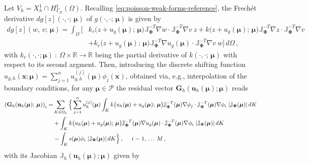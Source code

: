 \documentclass[12pt, a4paper, twoside, openright]{report}
\numberwithin{equation}{chapter}
\theoremstyle{theorem}
\theoremstyle{definition}
\theoremstyle{remark}
\theoremstyle{proposition}
\numberwithin{figure}{chapter}
\newcommand{\bg}[1]{\boldsymbol{#1}}
\begin{document}
		Let $V_h = X_h^1 \cap H^1_{\Gamma_D}(\Omega)$. Recalling \eqref{eq:poisson-weak-forms-reference}, the Frech\'et derivative $dg[z](\cdot, \cdot; \, \bg{\mu})$ of $g(\cdot, \cdot; \, \bg{\mu})$ is given by
		\begin{equation*}
			\begin{aligned}
			dg[z](w, \, v; \, \bg{\mu}) = \int_{\Omega} \big[ & k_r \big( z + u_g(\bg{\mu}); \, \bg{\mu} \big) \mathbb{J}^{-T}_{\bg{\Phi}} \nabla w \cdot \mathbb{J}^{-T}_{\bg{\Phi}} \nabla v ~ z + k \big( z + u_g(\bg{\mu}); \, \bg{\mu} \big) \mathbb{J}_{\bg{\Phi}}^{-T} \nabla z \cdot \mathbb{J}^{-T}_{\bg{\Phi}} \nabla v \\
			& + k_r \big(z + u_g(\bg{\mu}); \, \bg{\mu} \big) \mathbb{J}^{-T}_{\bg{\Phi}} \nabla u_g(\bg{\mu}) \cdot \mathbb{J}^{-T}_{\bg{\Phi}} \nabla v ~ w \big] \, d\Omega \, ,
			\end{aligned}
		\end{equation*} 
		with $k_r(\cdot, \cdot; \bg{\mu}) ~ : ~ \Omega \times \mathbb{R} \rightarrow \mathbb{R}$ being the partial derivative of $k(\cdot, \cdot; \, \bg{\mu})$ with respect to its second argment. Then, introducing the discrete shifting function $u_{g,h}(\bg{x}; \bg{\mu}) = \sum_{j = 1}^n u_{g,h}^{(j)}(\bg{\mu}) \phi_j(\bg{x})$, obtained via, e.g., interpolation of the boundary conditions, for any $\bg{\mu} \in \mathcal{P}$ the residual vector $\mathbf{G}_h(\mathbf{u}_h(\bg{\mu}); \bg{\mu})$ reads
		\begin{equation*}
			\label{eq:poisson-residual-vector}
			\begin{aligned}
				\left( \mathbf{G}_h(\mathbf{u}_h(\bg{\mu}); \, \bg{\mu}) \right)_i = & \sum_{K \in \Omega_h} \Big\lbrace \sum_{j = 1}^n u_h^{(j)}(\bg{\mu}) \int_K k \big( u_h(\bg{\mu}) + u_g(\bg{\mu}); \, \bg{\mu} \big) \mathbb{J}^{-T}_{\bg{\Phi}}(\bg{\mu}) \nabla \phi_j \cdot \mathbb{J}^{-T}_{\bg{\Phi}}(\bg{\mu}) \nabla \phi_i ~ |\mathbb{J}_{\bg{\Phi}}(\bg{\mu})| \, d K \\
				& + \int_K k \big( u_h(\bg{\mu}) + u_g(\bg{\mu}); \, \bg{\mu} \big) \mathbb{J}^{-T}_{\bg{\Phi}}(\bg{\mu}) \nabla u_g(\bg{\mu}) \cdot \mathbb{J}^{-T}_{\bg{\Phi}}(\bg{\mu}) \nabla \phi_i ~ |\mathbb{J}_{\bg{\Phi}}(\bg{\mu})| \, d K \\
				& - \int_K s(\bg{\mu}) \phi_i ~ |\mathbb{J}_{\bg{\Phi}}(\bg{\mu})| \, d K \Big\rbrace \, , \hspace*{0.5cm} i = 1, \, \ldots \, M \, ,
			\end{aligned}
		\end{equation*}
		with its Jacobian $\mathbb{J}_h(\mathbf{u}_h(\bg{\mu}); \bg{\mu})$ given by
\end{document}
